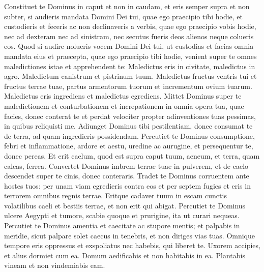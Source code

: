 \begin{biblechapter}
\begin{biblechapter}
\begin{biblechapter}
\begin{biblechapter}
\begin{biblechapter}
\begin{biblechapter}
\begin{biblechapter}
\begin{biblechapter}
\begin{biblechapter}
\begin{biblechapter}
\begin{biblechapter}
\begin{biblechapter}
\begin{biblechapter}
\begin{biblechapter}
\begin{biblechapter}
\begin{biblechapter}
\begin{biblechapter}
\begin{biblechapter}
\begin{biblechapter}
\begin{biblechapter}
\begin{biblechapter}
\begin{biblechapter}
\begin{biblechapter}
\begin{biblechapter}
\begin{biblechapter}
\begin{biblechapter}
\begin{biblechapter}
\begin{biblechapter}
\verse Constituet te Dominus in caput et non in caudam, et eris semper supra et non subter, si audieris mandata Domini Dei tui, quae ego praecipio tibi hodie, et custodieris et feceris 
\verse ac non declinaveris a verbis, quae ego praecipio vobis hodie, nec ad dexteram nec ad sinistram, nec secutus fueris deos alienos neque colueris eos.
 \verse Quod si audire nolueris vocem Domini Dei tui, ut custodias et facias omnia mandata eius et praecepta, quae ego praecipio tibi hodie, venient super te omnes maledictiones istae et apprehendent te:
 \verse Maledictus eris in civitate, maledictus in agro. 
\verse Maledictum canistrum et pistrinum tuum. 
\verse Maledictus fructus ventris tui et fructus terrae tuae, partus armentorum tuorum et incrementum ovium tuarum. 
\verse Maledictus eris ingrediens et maledictus egrediens.
 \verse Mittet Dominus super te maledictionem et conturbationem et increpationem in omnia opera tua, quae facies, donec conterat te et perdat velociter propter adinventiones tuas pessimas, in quibus reliquisti me. 
\verse Adiunget Dominus tibi pestilentiam, donec consumat te de terra, ad quam ingredieris possidendam. 
 \verse Percutiet te Dominus consumptione, febri et inflammatione, ardore et aestu, uredine ac aurugine, et persequentur te, donec pereas. 
\verse Et erit caelum, quod est supra caput tuum, aeneum, et terra, quam calcas, ferrea. 
\verse Convertet Dominus imbrem terrae tuae in pulverem, et de caelo descendet super te cinis, donec conteraris. 
\verse Tradet te Dominus corruentem ante hostes tuos: per unam viam egredieris contra eos et per septem fugies et eris in terrorem omnibus regnis terrae. 
\verse Eritque cadaver tuum in escam cunctis volatilibus caeli et bestiis terrae, et non erit qui abigat.
 \verse Percutiet te Dominus ulcere Aegypti et tumore, scabie quoque et prurigine, ita ut curari nequeas. 
\verse Percutiet te Dominus amentia et caecitate ac stupore mentis; 
\verse et palpabis in meridie, sicut palpare solet caecus in tenebris, et non diriges vias tuas. Omnique tempore eris oppressus et exspoliatus nec habebis, qui liberet te. 
\verse Uxorem accipies, et alius dormiet cum ea. Domum aedificabis et non habitabis in ea. Plantabis vineam et non vindemiabis eam. 

\end{biblechapter}
\end{biblechapter}
\end{biblechapter}
\end{biblechapter}
\end{biblechapter}
\end{biblechapter}
\end{biblechapter}
\end{biblechapter}
\end{biblechapter}
\end{biblechapter}
\end{biblechapter}
\end{biblechapter}
\end{biblechapter}
\end{biblechapter}
\end{biblechapter}
\end{biblechapter}
\end{biblechapter}
\end{biblechapter}
\end{biblechapter}
\end{biblechapter}
\end{biblechapter}
\end{biblechapter}
\end{biblechapter}
\end{biblechapter}
\end{biblechapter}
\end{biblechapter}
\end{biblechapter}
\end{biblechapter}
